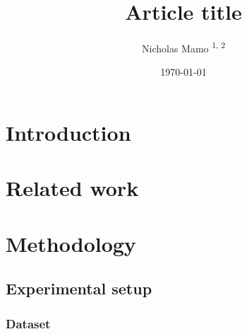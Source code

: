 \documentclass[onecolumn]{elegantarticle}
\title{Article title}
\author{Nicholas Mamo \textsuperscript{1, 2}}
\affiliation{\textsuperscript{1} University of Malta, Msida, Malta \\ \textsuperscript{2} Independent}
\date{\today}
\begin{document}
	\maketitle
	
	\section{Introduction}
	
		\lipsum[1-3]
	
	\section{Related work}
	
		\lipsum[4-8]
		
	\section{Methodology}
	
		\lipsum[9]
		
		\subsection{Experimental setup}
		
			\lipsum[10]
			
			\subsubsection{Dataset}
			
				\lipsum[11]
\end{document}
